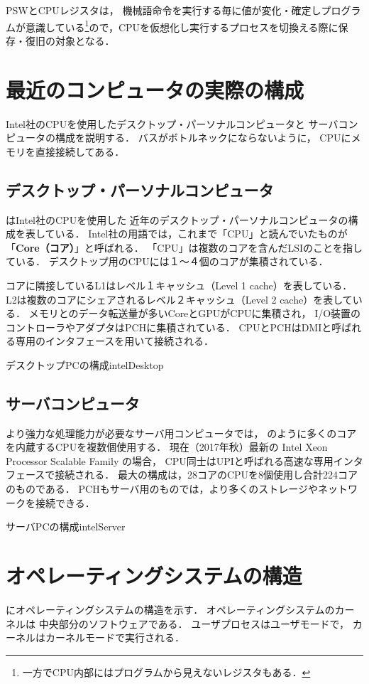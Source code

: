PSWとCPUレジスタは，
機械語命令を実行する毎に値が変化・確定しプログラムが意識している\footnote{
一方でCPU内部にはプログラムから見えないレジスタもある．
}ので，CPUを仮想化し実行するプロセスを切換える際に保存・復旧の対象となる．

\section{最近のコンピュータの実際の構成}

Intel社のCPUを使用したデスクトップ・パーソナルコンピュータと
サーバコンピュータの構成を説明する．
バスがボトルネックにならないように，
CPUにメモリを直接接続してある．

\subsection{デスクトップ・パーソナルコンピュータ}
はIntel社のCPUを使用した
近年のデスクトップ・パーソナルコンピュータの構成を表している．
Intel社の用語では，これまで「CPU」と読んでいたものが
「{\bf Core（コア）}」と呼ばれる．
「CPU」は複数のコアを含んだLSIのことを指している．
デスクトップ用のCPUには１〜４個のコアが集積されている．

コアに隣接しているL1はレベル１キャッシュ（Level 1 cache）を表している．
L2は複数のコアにシェアされるレベル２キャッシュ（Level 2 cache）を表している．
メモリとのデータ転送量が多いCoreとGPUがCPUに集積され，
I/O装置のコントローラやアダプタはPCHに集積されている．
CPUとPCHはDMIと呼ばれる専用のインタフェースを用いて接続される．

{デスクトップPCの構成}{intelDesktop}

\subsection{サーバコンピュータ}
より強力な処理能力が必要なサーバ用コンピュータでは，
のように多くのコアを内蔵するCPUを複数個使用する．
現在（2017年秋）最新の Intel Xeon Processor Scalable Family の場合，
CPU同士はUPIと呼ばれる高速な専用インタフェースで接続される．
最大の構成は，28コアのCPUを8個使用し合計224コアのものである．
PCHもサーバ用のものでは，より多くのストレージやネットワークを接続できる．

{サーバPCの構成}{intelServer}

\section{オペレーティングシステムの構造}
にオペレーティングシステムの構造を示す．
オペレーティングシステムのカーネルは
中央部分のソフトウェアである．
ユーザプロセスはユーザモードで，
カーネルはカーネルモードで実行される．

